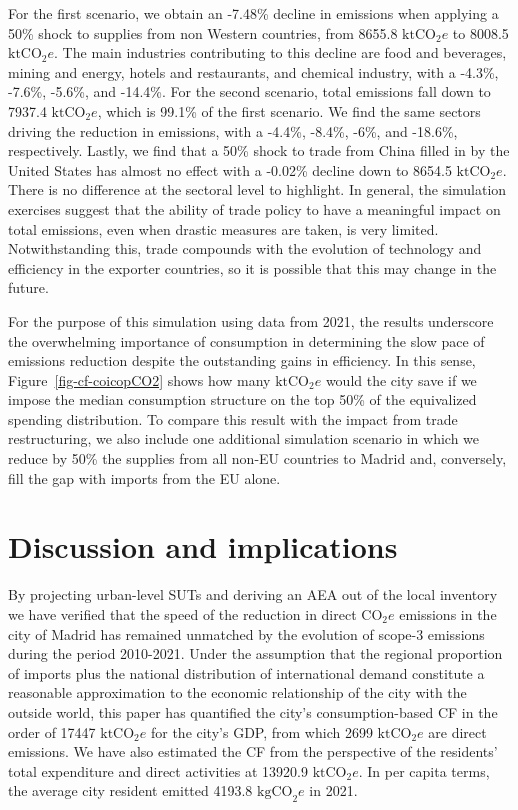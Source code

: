 \documentclass[
  10pt,
  twocolumn]{aft}
\begin{document}
For the first scenario, we obtain an -7.48\% decline in emissions when
applying a 50\% shock to supplies from non Western countries, from
8655.8 \(\text{ktCO}_2e\) to 8008.5 \(\text{ktCO}_2e\). The main
industries contributing to this decline are food and beverages, mining
and energy, hotels and restaurants, and chemical industry, with a
-4.3\%, -7.6\%, -5.6\%, and -14.4\%. For the second scenario, total
emissions fall down to 7937.4 \(\text{ktCO}_2e\), which is 99.1\% of the
first scenario. We find the same sectors driving the reduction in
emissions, with a -4.4\%, -8.4\%, -6\%, and -18.6\%, respectively.
Lastly, we find that a 50\% shock to trade from China filled in by the
United States has almost no effect with a -0.02\% decline down to 8654.5
\(\text{ktCO}_2e\). There is no difference at the sectoral level to
highlight. In general, the simulation exercises suggest that the ability
of trade policy to have a meaningful impact on total emissions, even
when drastic measures are taken, is very limited. Notwithstanding this,
trade compounds with the evolution of technology and efficiency in the
exporter countries, so it is possible that this may change in the
future.

For the purpose of this simulation using data from 2021, the results
underscore the overwhelming importance of consumption in determining the
slow pace of emissions reduction despite the outstanding gains in
efficiency. In this sense, Figure~\ref{fig-cf-coicopCO2} shows how many
\(\text{ktCO}_2e\) would the city save if we impose the median
consumption structure on the top 50\% of the equivalized spending
distribution. To compare this result with the impact from trade
restructuring, we also include one additional simulation scenario in
which we reduce by 50\% the supplies from all non-EU countries to Madrid
and, conversely, fill the gap with imports from the EU alone.

\section{Discussion and implications}\label{sec-implications}

By projecting urban-level SUTs and deriving an AEA out of the local
inventory we have verified that the speed of the reduction in direct
\(\text{CO}_2e\) emissions in the city of Madrid has remained unmatched
by the evolution of scope-3 emissions during the period 2010-2021. Under
the assumption that the regional proportion of imports plus the national
distribution of international demand constitute a reasonable
approximation to the economic relationship of the city with the outside
world, this paper has quantified the city's consumption-based CF in the
order of 17447 \(\text{ktCO}_2e\) for the city's GDP, from which 2699
\(\text{ktCO}_2e\) are direct emissions. We have also estimated the CF
from the perspective of the residents' total expenditure and direct
activities at 13920.9 \(\text{ktCO}_2e\). In per capita terms, the
average city resident emitted 4193.8 \(\text{kgCO}_2e\) in 2021.
\end{document}
